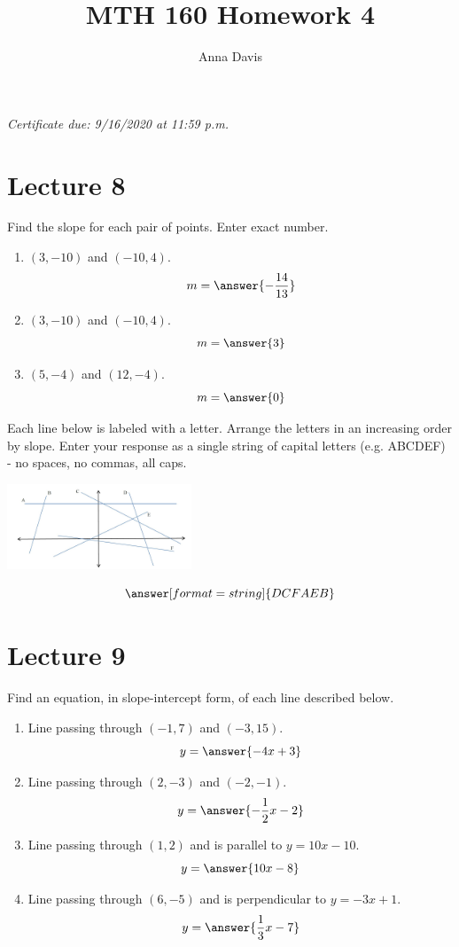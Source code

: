 \documentclass{ximera}
\author{Anna Davis} \title{MTH 160 Homework 4}
\begin{document}
\begin{abstract}

\end{abstract}
\maketitle
 \textit{Certificate due: 9/16/2020 at 11:59 p.m.}
 \section{Lecture 8}
\begin{problem}\label{prob:160hom4prob1} 
 Find the slope for each pair of points.  Enter exact number.
 \begin{enumerate}
     \item $(3, -10)$ and $(-10,4)$.
     $$m=\answer{-\frac{14}{13}}$$
     \item $(3, -10)$ and $(-10,4)$.
     $$m=\answer{3}$$
     \item $(5, -4)$ and $(12,-4)$.
     $$m=\answer{0}$$
 \end{enumerate}
 \end{problem}
 
 \begin{problem}\label{prob:160hom4prob2} 
 Each line below is labeled with a letter.  Arrange the letters in an increasing order by slope.  Enter your response as a single string of capital letters (e.g. ABCDEF) - no spaces, no commas, all caps.
 
 \begin{image}
   \includegraphics[height=1in]{160H4pic1.jpg}
 \end{image}
 $$\answer[format=string]{DCFAEB}$$
 \end{problem}
 \section{Lecture 9}
\begin{problem}\label{prob:160hom4prob3}
Find an equation, in slope-intercept form, of each line described below.
  \begin{enumerate}
      \item Line passing through $(-1, 7)$ and $(-3, 15)$.
      $$y=\answer{-4x+3}$$
      \item Line passing through $(2, -3)$ and $(-2, -1)$.
      $$y=\answer{-\frac{1}{2}x-2}$$
      \item Line passing through $(1,2)$ and is parallel to $y=10x-10$.
      $$y=\answer{10x-8}$$
      \item Line passing through $(6, -5)$ and is perpendicular to $y=-3x+1$.
      $$y=\answer{\frac{1}{3}x-7}$$
  \end{enumerate}
\end{problem}
\end{document}
